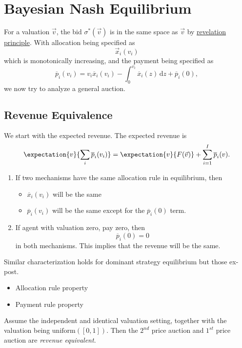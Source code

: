 \section{Bayesian Nash Equilibrium}
\begin{prev}
	For a valuation \(\vec{v}\), the bid \(\sigma^{\ast}(\vec{v})\) is in the same space as \(\vec{v}\) by \hyperref[Revelation-Principle]{revelation principle}.
	With allocation being specified as
	\[
		\vec{x}_{i}(v_{i})
	\]
	which is monotonically increasing, and the payment being specified as
	\[
		\overline{p}_{i}(v_{i}) = v_{i}\overline{x}_{i}(v_{i}) - \int_0^{v_{i}}\overline{x}_{i}(z)\,\mathrm{d}z + \overline{p}_{i}(0),
	\]
	we now try to analyze a general auction.
\end{prev}

\subsection{Revenue Equivalence}
We start with the expected revenue. The expected revenue is
\[
	\expectation{v}{\sum\limits_{i}\overline{p}_{i}(v_{i}) } = \expectation{v}{F(\vec{v})} + \sum\limits_{i=1}^{I} \overline{p}_{i}(v).
\]
\begin{enumerate}
	\item If two mechanisms have the same allocation rule in equilibrium, then
	      \begin{itemize}
		      \item \(\overline{x}_{i}(v_{i})\) will be the same
		      \item \(\overline{p}_{i}(v_{i})\) will be the same except for the \(\overline{p}_{i}(0)\) term.
	      \end{itemize}
	\item If agent with valuation zero, pay zero, then
	      \[
		      \overline{p}_{i}(0) = 0
	      \]
	      in both mechanisms. This implies that the revenue will be the same.
\end{enumerate}

\begin{note}
	Similar characterization holds for dominant strategy equilibrium but those ex-post.
	\begin{itemize}
		\item Allocation rule property
		\item Payment rule property
	\end{itemize}
\end{note}

Assume the independent and identical valuation setting, together with the valuation being \(\mathrm{uniform}([0,1])\). Then the \(2^{nd}\) price auction
and \(1^{st}\) price auction are \emph{revenue equivalent}.


